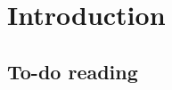 \documentclass[a4paper,12pt,openany]{book}
\begin{document}
\newpage

\begin{spacing}{1}
\tableofcontents
\end{spacing}

\newpage

\setcounter{page}{1}
\pagestyle{fancy}
\fancyhf{}
\renewcommand{\headrulewidth}{0pt}
\fancyhead[LE]{\fontsize{11}{12} \selectfont\nouppercase{\thepage}}
\fancyhead[RE]{\fontsize{11}{12} \selectfont\nouppercase{\leftmark}}
\fancyhead[LO]{\fontsize{11}{12} \selectfont\nouppercase{\rightmark}}
\fancyhead[RO]{\fontsize{11}{12} \selectfont\nouppercase{\thepage}}
\allowdisplaybreaks
\setlength{\abovedisplayskip}{10pt}
\setlength{\belowdisplayskip}{10pt}
\setlength{\abovedisplayshortskip}{-12pt}%
\setlength{\belowdisplayshortskip}{0pt}
\hypertarget{introduction}{%
\chapter*{Introduction}\label{introduction}}

\hypertarget{to-do-reading}{%
\section*{To-do reading}\label{to-do-reading}}
\end{document}
